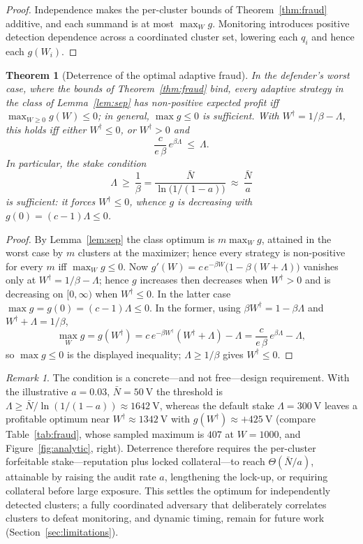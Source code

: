 \documentclass[11pt]{article}
\theoremstyle{plain}
\newtheorem{theorem}{Theorem}
\theoremstyle{definition}
\theoremstyle{remark}
\newtheorem{remark}{Remark}
\newcommand{\V}{\mathrm{V}}
\begin{document}
\begin{proof}
Independence makes the per-cluster bounds of Theorem~\ref{thm:fraud} additive, and each summand is at most $\max_W g$. Monitoring introduces positive detection dependence across a coordinated cluster set, lowering each $q_i$ and hence each $g(W_i)$.
\end{proof}

\begin{theorem}[Deterrence of the optimal adaptive fraud]\label{thm:deter}
In the defender's worst case, where the bounds of Theorem~\ref{thm:fraud} bind, every adaptive strategy in the class of Lemma~\ref{lem:sep} has non-positive expected profit iff $\max_{W\ge0}g(W)\le0$; in general, $\max g\le0$ is sufficient. With $W^\dagger=1/\beta-\Lambda$, this holds iff either $W^\dagger\le0$, or $W^\dagger>0$ and
\[
\frac{c}{e\,\beta}\,e^{\beta \Lambda}\ \le\ \Lambda .
\]
In particular, the stake condition
\[
\Lambda\ \ge\ \frac1\beta=\frac{\bar N}{\ln\!\bigl(1/(1-a)\bigr)}\ \approx\ \frac{\bar N}{a}
\]
is sufficient: it forces $W^\dagger\le0$, whence $g$ is decreasing with $g(0)=(c-1)\Lambda\le0$.
\end{theorem}

\begin{proof}
By Lemma~\ref{lem:sep} the class optimum is $m\max_W g$, attained in the worst case by $m$ clusters at the maximizer; hence every strategy is non-positive for every $m$ iff $\max_W g\le0$. Now $g'(W)=c\,e^{-\beta W}\bigl(1-\beta(W+\Lambda)\bigr)$ vanishes only at $W^\dagger=1/\beta-\Lambda$; hence $g$ increases then decreases when $W^\dagger>0$ and is decreasing on $[0,\infty)$ when $W^\dagger\le0$. In the latter case $\max g=g(0)=(c-1)\Lambda\le0$. In the former, using $\beta W^\dagger=1-\beta \Lambda$ and $W^\dagger+\Lambda=1/\beta$,
\[
\max_W g=g(W^\dagger)=c\,e^{-\beta W^\dagger}(W^\dagger+\Lambda)-\Lambda=\frac{c}{e\,\beta}\,e^{\beta \Lambda}-\Lambda ,
\]
so $\max g\le0$ is the displayed inequality; $\Lambda\ge1/\beta$ gives $W^\dagger\le0$.
\end{proof}

\begin{remark}
The condition is a concrete---and not free---design requirement. With the illustrative $a=0.03$, $\bar N=50~\V$ the threshold is $\Lambda\ge\bar N/\ln(1/(1-a))\approx1642~\V$, whereas the default stake $\Lambda=300~\V$ leaves a profitable optimum near $W^\dagger\approx1342~\V$ with $g(W^\dagger)\approx{+}425~\V$ (compare Table~\ref{tab:fraud}, whose sampled maximum is $407$ at $W=1000$, and Figure~\ref{fig:analytic}, right). Deterrence therefore requires the per-cluster forfeitable stake---reputation plus locked collateral---to reach $\Theta(\bar N/a)$, attainable by raising the audit rate $a$, lengthening the lock-up, or requiring collateral before large exposure. This settles the optimum for independently detected clusters; a fully coordinated adversary that deliberately correlates clusters to defeat monitoring, and dynamic timing, remain for future work (Section~\ref{sec:limitations}).
\end{remark}
\end{document}

